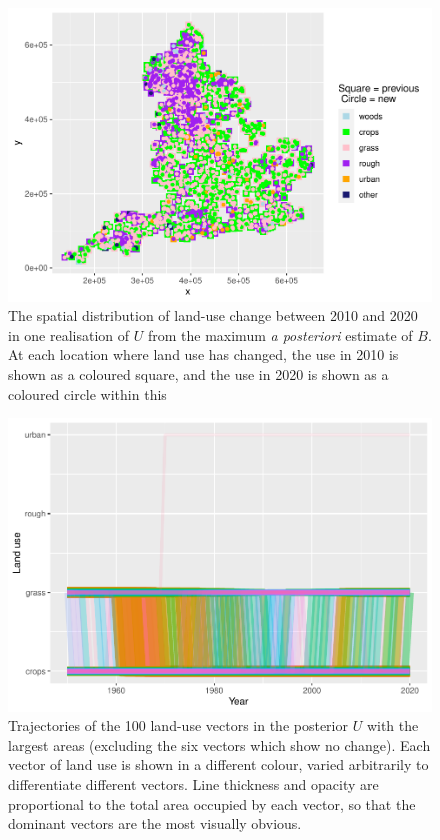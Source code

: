 \documentclass[
]{book}
\begin{document}
\begin{figure}
\centering
\includegraphics{Results_en_files/figure-latex/plotUd-1.pdf}
\caption{\label{fig:plotUd}The spatial distribution of land-use change between 2010 and 2020 in one realisation of \(U\) from the maximum \emph{a posteriori} estimate of \(B\). At each location where land use has changed, the use in 2010 is shown as a coloured square, and the use in 2020 is shown as a coloured circle within this}
\end{figure}

\begin{figure}
\centering
\includegraphics{Results_en_files/figure-latex/plotv1-1.pdf}
\caption{\label{fig:plotv1}Trajectories of the 100 land-use vectors in the posterior \(U\) with the largest areas (excluding the six vectors which show no change). Each vector of land use is shown in a different colour, varied arbitrarily to differentiate different vectors. Line thickness and opacity are proportional to the total area occupied by each vector, so that the dominant vectors are the most visually obvious.}
\end{figure}
\end{document}
